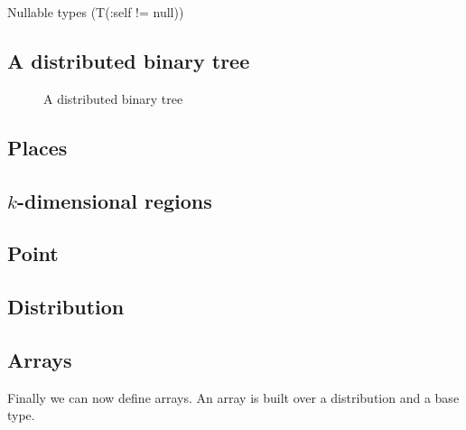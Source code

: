 Nullable types (T(:self != null))


\subsection{A distributed binary tree}

\begin{figure*}

\caption{A distributed binary tree}
\label{fig:dist-tree}
\end{figure*}

\subsection{Places}

% 

\subsection{$k$-dimensional regions}

% 

\subsection{Point}

% 

\subsection{Distribution}

% 

\subsection{Arrays}

\cite{gps06-arrays}

Finally we can now define arrays. An array is built over a
distribution and a base type.

% 

